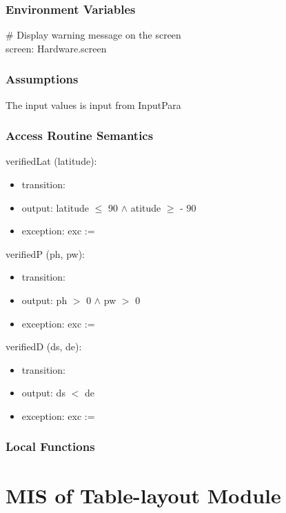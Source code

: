 \documentclass[12pt, titlepage]{article}
\begin{document}
\subsubsection{Environment Variables}
\# Display warning message on the screen\\
screen: Hardware.screen\\

\subsubsection{Assumptions}
The input values is input from InputPara


\subsubsection{ Access Routine Semantics}

\noindent  verifiedLat (latitude):
\begin{itemize}
\item transition: 
\item output: latitude $\leq$ 90 $\land$ atitude $\geq$ - 90 

\item exception: exc := 
\end{itemize}

\noindent  verifiedP (ph, pw):
\begin{itemize}
\item transition: 
\item output: ph $>$ 0 $\land$ pw $>$ 0 

\item exception: exc := 
\end{itemize}

\noindent  verifiedD (ds, de):
\begin{itemize}
\item transition: 
\item output: ds $<$ de 

\item exception: exc := 
\end{itemize}

\subsubsection{Local Functions}



\newpage



\section{MIS of Table-layout Module} \label{ModuleT} 
\end{document}

